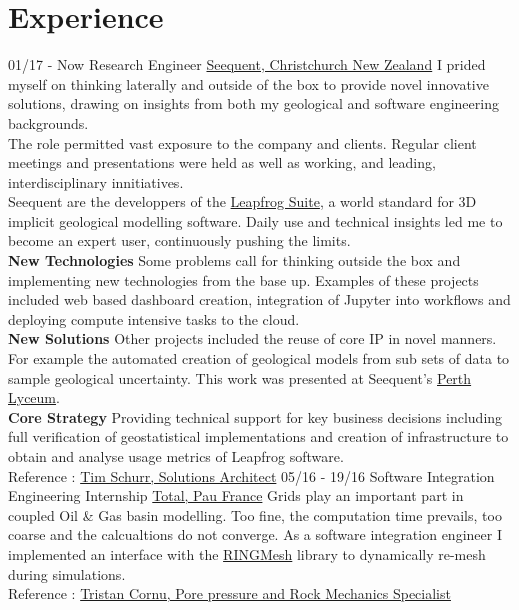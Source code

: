 \documentclass[]{friggeri-cv}
\begin{document}
\section{Experience}
\begin{entrylist}
  \entry
    {01/17 - Now}
    {Research Engineer}
    {\href{https://www.seequent.com/}{Seequent, Christchurch New Zealand}}
    {I prided myself on thinking laterally and outside of the box to provide novel innovative solutions, drawing on insights from both my geological and software engineering backgrounds.
    \\[3pt]
    The role permitted vast exposure to the company and clients. Regular client meetings and presentations were held as well as working, and leading, interdisciplinary innitiatives.
    \\[3pt]
    Seequent are the developpers of the \href{https://www.leapfrog3d.com/}{Leapfrog Suite}, a world standard for 3D implicit geological modelling software. Daily use and technical insights led me to become an expert user, continuously pushing the limits.
    \\[6pt]
   	\textbf{New Technologies} Some problems call for thinking outside the box and implementing new technologies from the base up. Examples of these projects included web based dashboard creation, integration of Jupyter into workflows and deploying compute intensive tasks to the cloud.
   	\\[6pt]
   	\textbf{New Solutions} Other projects included the reuse of core IP in novel manners. For example the automated creation of geological models from sub sets of data to sample geological uncertainty. This work was presented at Seequent's \href{https://lyceum-perth.seequent.com/}{Perth Lyceum}.
    \\[6pt]
   	\textbf{Core Strategy} Providing technical support for key business decisions including full verification of geostatistical implementations and creation of infrastructure to obtain and analyse usage metrics of Leapfrog software. 
    \\
    Reference : \href{mailto:tim.schurr@seequent.com}{Tim Schurr, Solutions Architect}
	}
  \entry
    {05/16 - 19/16}
    {Software Integration Engineering Internship}
    {\href{https://www.total.com/en}{Total, Pau France}}
    {Grids play an important part in coupled Oil \& Gas basin modelling. Too fine, the computation time prevails, too coarse and the calcualtions do not converge. As a software integration engineer I implemented an interface with the \href{http://www.ring-team.org/software/ringmesh}{RINGMesh} library to dynamically re-mesh during simulations.\\ Reference : \href{mailto:tristan.cornu@total.com}{Tristan Cornu, Pore pressure and Rock Mechanics Specialist}}
    \end{entrylist}
    
\end{document}

